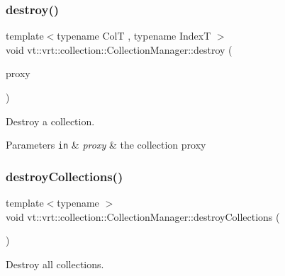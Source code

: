 \subsubsection{\texorpdfstring{destroy()}{destroy()}}
{\footnotesize\ttfamily template$<$typename ColT , typename IndexT $>$ \\
void vt\+::vrt\+::collection\+::\+Collection\+Manager\+::destroy (\begin{DoxyParamCaption}\item[{\hyperlink{structvt_1_1vrt_1_1collection_1_1_collection_manager_a56458ed7f9bb22b631b9b3a745f42f94}{Collection\+Proxy\+Wrap\+Type}$<$ ColT, IndexT $>$ const \&}]{proxy }\end{DoxyParamCaption})}



Destroy a collection. 


\begin{DoxyParams}[1]{Parameters}
\mbox{\tt in}  & {\em proxy} & the collection proxy \\
\hline
\end{DoxyParams}
\mbox{\label{structvt_1_1vrt_1_1collection_1_1_collection_manager_a71865b0508bab58b6d44b44416f11983}} 
\subsubsection{\texorpdfstring{destroy\+Collections()}{destroyCollections()}}
{\footnotesize\ttfamily template$<$typename $>$ \\
void vt\+::vrt\+::collection\+::\+Collection\+Manager\+::destroy\+Collections (\begin{DoxyParamCaption}{ }\end{DoxyParamCaption})}



Destroy all collections. 

\mbox{\label{structvt_1_1vrt_1_1collection_1_1_collection_manager_a85a108cba84e45371d2c29d3072adcbe}} 
